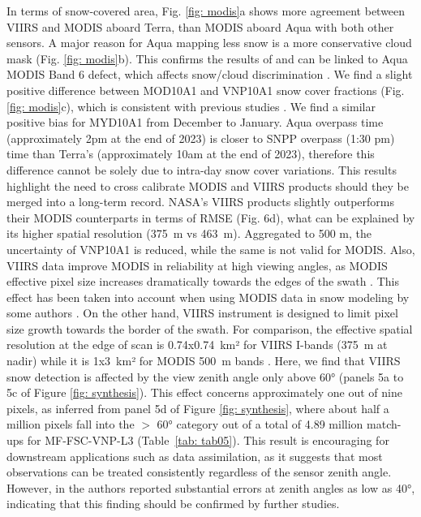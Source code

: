 \documentclass[tc, manuscript]{copernicus}
\begin{document}
In terms of snow-covered area, Fig. \ref{fig: modis}a shows more agreement between VIIRS and MODIS aboard Terra, than MODIS aboard Aqua with both other sensors. A major reason for Aqua mapping less snow is a more conservative cloud mask (Fig. \ref{fig: modis}b). This confirms the results of \cite{liu2022EffectCloudMask} \cite{thapa_cross-comparison_2019} and can be linked to Aqua MODIS Band 6 defect, which affects snow/cloud discrimination \citep{riggs2021MODISAquaSnow}. We find a slight positive difference between MOD10A1 and VNP10A1 snow cover fractions (Fig. \ref{fig: modis}c), which is consistent with previous studies \cite{jacques-hamilton_measurement_2025,stillinger_landsat_2023,liu2022EffectCloudMask,keuris_adaptive_2023}. We find a similar positive bias for MYD10A1 from December to January. Aqua overpass time (approximately 2pm at the end of 2023) is closer to SNPP overpass (1:30 pm) time than Terra’s (approximately 10am at the end of 2023), therefore this difference cannot be solely due to intra-day snow cover variations. This results highlight the need to cross calibrate MODIS and VIIRS products should they be merged into a long-term record. NASA’s VIIRS products slightly outperforms their MODIS counterparts in terms of RMSE (Fig. 6d), what can be explained by its higher spatial resolution (375~m vs 463~m). Aggregated to 500 m, the uncertainty of VNP10A1 is reduced, while the same is not valid for MODIS. Also, VIIRS data improve MODIS in reliability at high viewing angles, as MODIS effective pixel size increases dramatically towards the edges of the swath \citep{dozier2008TimeSpaceContinuity}. This effect has been taken into account when using MODIS data in snow modeling by some authors \citep{sun_evaluation_2024}. On the other hand, VIIRS instrument is designed to limit pixel size growth towards the border of the swath. For comparison, the effective spatial resolution at the edge of scan is 0.74x0.74~km² for VIIRS I-bands (375~m at nadir) while it is 1x3~km² for MODIS 500~m bands \citep{schueler_viirs_2013}. Here, we find that VIIRS snow detection is affected by the view zenith angle only above 60° (panels 5a to 5c of Figure \ref{fig: synthesis}). This effect concerns approximately one out of nine pixels, as inferred from panel 5d of Figure \ref{fig: synthesis}, where about half a million pixels fall into the $>$ 60° category out of a total of 4.89 million match-ups for MF-FSC-VNP-L3 (Table~\ref{tab: tab05}). This result is encouraging for downstream applications such as data assimilation, as it suggests that most observations can be treated consistently regardless of the sensor zenith angle. However, in \citep{stillinger_landsat_2023} the authors reported substantial errors at zenith angles as low as 40°, indicating that this finding should be confirmed by further studies.
\end{document}
